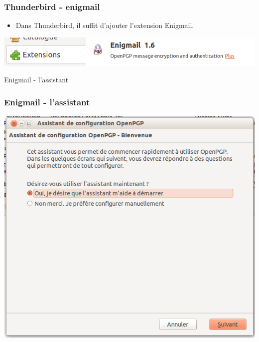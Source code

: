 \documentclass{beamer}
\begin{document}
\begin{frame}
\frametitle{Thunderbird - enigmail}
\begin{itemize}
\item Dans Thunderbird, il suffit d'ajouter l'extension Enigmail.
\end{itemize}
\begin{center}
\includegraphics[scale=0.5] {./images/Thunderbird_Extension_Enigmail.png}
\end{center}
\end{frame}


\begin{frame}
\begin{center}
\Huge{Enigmail - l'assistant}
\end{center}
\end{frame}

\begin{frame}
\frametitle{Enigmail - l'assistant}
\begin{center}
\includegraphics[scale=0.3] {./images/Assistant01.png}
\end{center}
\end{frame}
\end{document}
